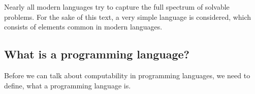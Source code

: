 Nearly all modern languages try to capture the full spectrum of solvable 
problems. For the sake of this text, a very simple language is considered, 
which consists of elements common in modern languages.

\subsection{What is a programming language?} %
\label{sub:What is a programming language}
Before we can talk about computability in programming languages, we need to 
define, what a programming language is. 


